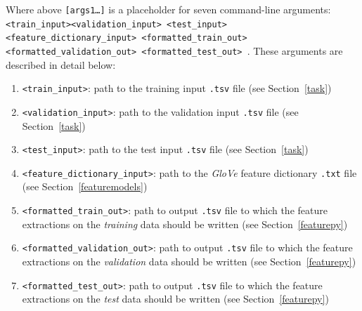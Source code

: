 \documentclass[11pt,addpoints,answers]{exam}
\begin{document}
Where above \texttt{[args1\dots]} is a placeholder for seven command-line arguments: \texttt{<train\_input>}\newline \texttt{<validation\_input> <test\_input>  <feature\_dictionary\_input> \newline <formatted\_train\_out> <formatted\_validation\_out>  <formatted\_test\_out> }. These arguments are described in detail below:
\begin{enumerate}
    \item \texttt{<train\_input>}: path to the training input \texttt{.tsv} file (see Section~\ref{task})
    \item \texttt{<validation\_input>}: path to the validation input \texttt{.tsv} file (see Section~\ref{task})
    \item \texttt{<test\_input>}: path to the test input \texttt{.tsv} file (see Section~\ref{task})
    \item \texttt{<feature\_dictionary\_input>}: path to the \emph{GloVe} feature dictionary \texttt{.txt} file (see Section~\ref{featuremodels})
    \item \texttt{<formatted\_train\_out>}: path to output \texttt{.tsv} file to which the feature extractions on the \emph{training} data should be written (see Section~\ref{featurepy})
    \item \texttt{<formatted\_validation\_out>}: path to output \texttt{.tsv} file to which the feature extractions on the \emph{validation} data should be written (see Section~\ref{featurepy})
    \item \texttt{<formatted\_test\_out>}: path to output \texttt{.tsv} file to which the feature extractions on the \emph{test} data should be written (see Section~\ref{featurepy})
\end{enumerate}
\end{document}
